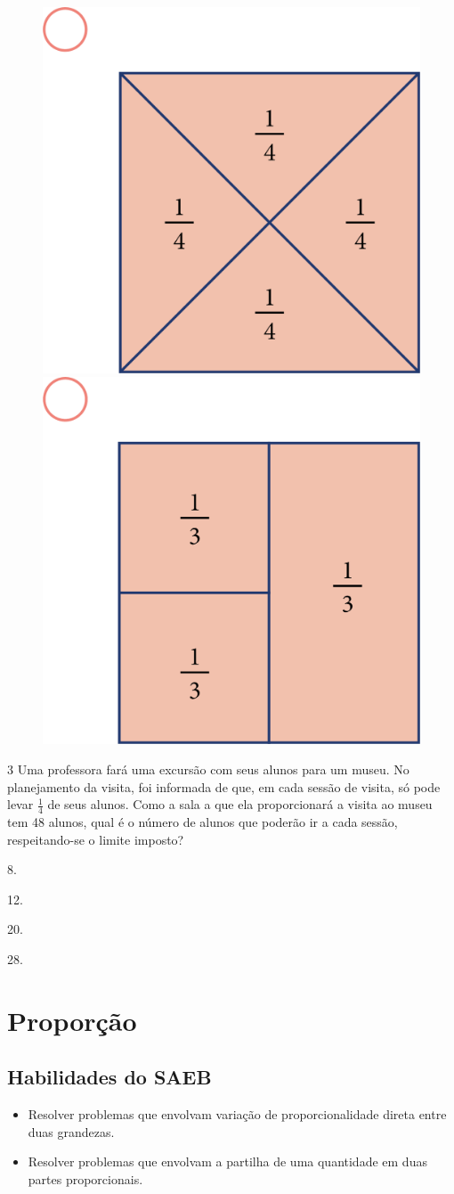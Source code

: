 \begin{figure}[htpb!]
\includegraphics[width=.3\textwidth]{media/image68.png}
\includegraphics[width=.3\textwidth]{media/image69.png}
\end{figure}

\num{3} Uma professora fará uma excursão com seus alunos para um museu. No
planejamento da visita, foi informada de que, em cada sessão de visita, só
pode levar $\frac{1}{4}$ de seus alunos. Como a sala a que ela proporcionará a
visita ao museu tem 48 alunos, qual é o número de alunos que poderão ir a
cada sessão, respeitando-se o limite imposto?

\begin{escolha}
\item
  8.

\item
  12.

\item
  20.

\item
  28.
\end{escolha}

\chapter{Proporção}

\section*{Habilidades do SAEB}

\begin{itemize}
\item Resolver problemas que envolvam variação de proporcionalidade direta
entre duas grandezas.

\item Resolver problemas que envolvam a partilha de uma quantidade em duas
partes proporcionais.
\end{itemize}

